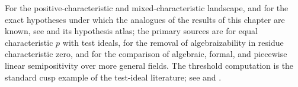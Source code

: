 For the positive-characteristic and mixed-characteristic landscape, and for
the exact hypotheses under which the analogues of the results of this
chapter are known, see  and its hypothesis atlas;
the primary sources are \cite{GJKM19} for equal characteristic $p$ with
test ideals, \cite{BGGJKM20} for the removal of algebraizability in residue
characteristic zero, and \cite{GM19} for the comparison of algebraic,
formal, and piecewise linear semipositivity over more general fields.  The
threshold computation  is the standard cusp example
of the test-ideal literature; see \cite{HY03} and \cite{ST12}.
